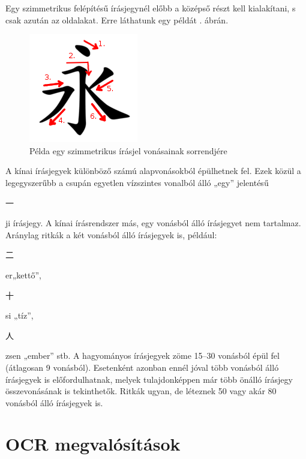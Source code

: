 Egy szimmetrikus felépítésű írásjegynél előbb a középső részt kell kialakítani, s csak azután az oldalakat. Erre láthatunk egy példát . ábrán.

\begin{figure}
	\centering
	\includegraphics[scale=1.0]{images/vonasrend_ordered.png}
	\caption{Példa egy szimmetrikus írásjel vonásainak sorrendjére}
	\label{fig:sorrend_pelda}
\end{figure}

A kínai írásjegyek különböző számú alapvonásokból épülhetnek fel. Ezek közül a legegyszerűbb a csupán egyetlen vízszintes vonalból álló „egy” jelentésű \begin{CJK*}{UTF8}{gbsn}
一
\end{CJK*} ji írásjegy. A kínai írásrendszer más, egy vonásból álló írásjegyet nem tartalmaz. Aránylag ritkák a két vonásból álló írásjegyek is, például: \begin{CJK*}{UTF8}{gbsn}
二
\end{CJK*} er„kettő”,
\begin{CJK*}{UTF8}{gbsn}
十
\end{CJK*} si „tíz”,
\begin{CJK*}{UTF8}{gbsn}
人
\end{CJK*} zsen „ember” stb. A hagyományos írásjegyek zöme 15–30 vonásból épül fel (átlagosan 9 vonásból). Esetenként azonban ennél jóval több vonásból álló írásjegyek is előfordulhatnak, melyek tulajdonképpen már több önálló írásjegy összevonásának is tekinthetők. Ritkák ugyan, de léteznek 50 vagy akár 80 vonásból álló írásjegyek is.

\section{OCR megvalósítások}

